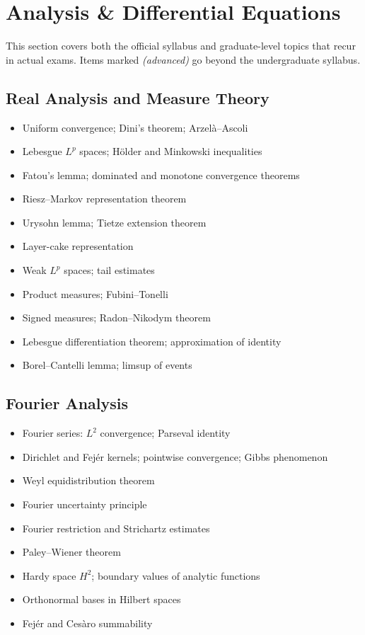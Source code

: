 \section{Analysis \& Differential Equations}
\label{sec:prep-analysis}

This section covers both the official syllabus and graduate-level topics that recur in actual exams. Items marked \textit{(advanced)} go beyond the undergraduate syllabus.

\subsection{Real Analysis and Measure Theory}

\begin{itemize}
  \item Uniform convergence; Dini's theorem; Arzel\`a--Ascoli
  \item Lebesgue $L^p$ spaces; H\"older and Minkowski inequalities
  \item Fatou's lemma; dominated and monotone convergence theorems
  \item Riesz--Markov representation theorem
  \item Urysohn lemma; Tietze extension theorem
  \item Layer-cake representation
  \item Weak $L^p$ spaces; tail estimates
  \item Product measures; Fubini--Tonelli
  \item Signed measures; Radon--Nikodym theorem
  \item Lebesgue differentiation theorem; approximation of identity
  \item Borel--Cantelli lemma; limsup of events
\end{itemize}

\subsection{Fourier Analysis}

\begin{itemize}
  \item Fourier series: $L^2$ convergence; Parseval identity
  \item Dirichlet and Fej\'er kernels; pointwise convergence; Gibbs phenomenon
  \item Weyl equidistribution theorem
  \item Fourier uncertainty principle
  \item Fourier restriction and Strichartz estimates
  \item Paley--Wiener theorem
  \item Hardy space $H^2$; boundary values of analytic functions
  \item Orthonormal bases in Hilbert spaces
  \item Fej\'er and Ces\`aro summability
\end{itemize}

